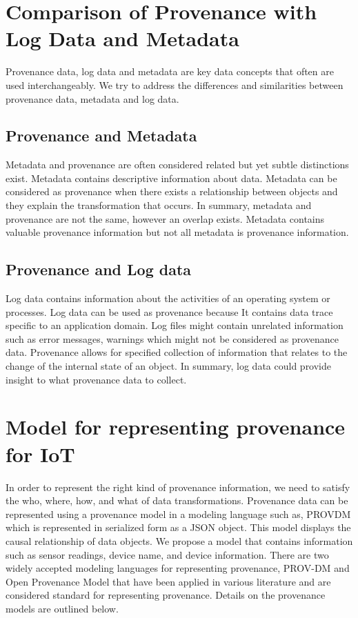 \section{Comparison of Provenance with Log Data and Metadata}

Provenance data, log data and metadata are key data concepts that often are used interchangeably. We try to address the differences and similarities between provenance data, metadata and log data.

\subsection{Provenance and Metadata}
Metadata and provenance are often considered related but yet subtle distinctions exist. Metadata contains descriptive information about data. Metadata can be considered as provenance when there exists a relationship between objects and they explain the transformation that occurs. In summary,  metadata and provenance are not the same, however an overlap exists. Metadata contains valuable  provenance information but not all metadata is provenance information. 


\subsection{Provenance and Log data}
Log data contains information about the activities of an operating system or processes. Log data can be used as provenance because It contains data trace specific to an application domain. Log files might contain unrelated information such as error messages, warnings which might not be considered as provenance data. Provenance allows for specified collection of information that relates to the change of the internal state of an object. In summary, log data could provide insight to what provenance data to collect. 

\section{Model for representing provenance for IoT}

In order to represent the right kind of provenance information, we need to satisfy the who, where, how, and what of data transformations. Provenance data can be represented using a provenance model in a modeling language such as, PROV\-DM which is represented in serialized form as a JSON object. This model displays the causal relationship of data objects. We propose a model that contains information such as sensor readings, device name, and device information. There are two widely accepted modeling languages for representing provenance, PROV-DM \cite{prov_dm} and  Open Provenance Model \cite{moreau_open_2011} that have been applied in various literature and are considered standard for representing provenance. Details on the provenance models are outlined below.

